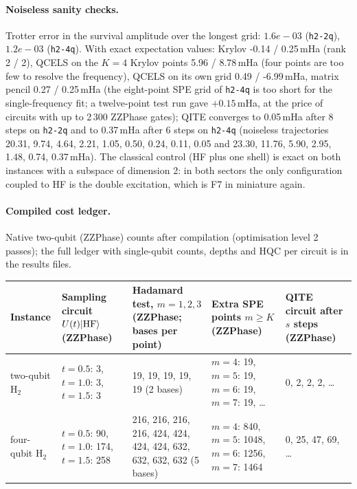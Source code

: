 \documentclass[11pt,a4paper]{article}
\newcommand{\ket}[1]{\lvert #1\rangle}
\begin{document}
\paragraph{Noiseless sanity checks.} Trotter error in the survival amplitude over the longest grid: $1.6e-03$ (\texttt{h2-2q}), $1.2e-03$ (\texttt{h2-4q}). With exact expectation values: Krylov -0.14 / 0.25\,mHa (rank 2 / 2), QCELS on the $K=4$ Krylov points 5.96 / 8.78\,mHa (four points are too few to resolve the frequency), QCELS on its own grid 0.49 / -6.99\,mHa, matrix pencil 0.27 / 0.25\,mHa (the eight-point SPE grid of \texttt{h2-4q} is too short for the single-frequency fit; a twelve-point test run gave $+0.15$\,mHa, at the price of circuits with up to 2\,300 ZZPhase gates); QITE converges to 0.05\,mHa after 8 steps on \texttt{h2-2q} and to 0.37\,mHa after 6 steps on \texttt{h2-4q} (noiseless trajectories 20.31, 9.74, 4.64, 2.21, 1.05, 0.50, 0.24, 0.11, 0.05 and 23.30, 11.76, 5.90, 2.95, 1.48, 0.74, 0.37\,mHa). The classical control (HF plus one shell) is exact on both instances with a subspace of dimension 2: in both sectors the only configuration coupled to HF is the double excitation, which is F7 in miniature again.

\paragraph{Compiled cost ledger.} Native two-qubit (ZZPhase) counts after compilation (optimisation level 2 passes); the full ledger with single-qubit counts, depths and HQC per circuit is in the results files.
\begin{center}\small
\begin{tabularx}{\linewidth}{@{}L{2.4cm}YYYY@{}}
\toprule
Instance & Sampling circuit $U(t)\ket{\rm HF}$ (ZZPhase) & Hadamard test, $m=1,2,3$ (ZZPhase; bases per point) & Extra SPE points $m\ge K$ (ZZPhase) & QITE circuit after $s$ steps (ZZPhase)\\\midrule
two-qubit H$_2$ & $t=0.5$: 3, $t=1.0$: 3, $t=1.5$: 3 & 19, 19, 19, 19, 19 (2 bases) & $m=4$: 19, $m=5$: 19, $m=6$: 19, $m=7$: 19, \ldots & 0, 2, 2, 2, \ldots\\
four-qubit H$_2$ & $t=0.5$: 90, $t=1.0$: 174, $t=1.5$: 258 & 216, 216, 216, 216, 424, 424, 424, 424, 632, 632, 632, 632 (5 bases) & $m=4$: 840, $m=5$: 1048, $m=6$: 1256, $m=7$: 1464 & 0, 25, 47, 69, \ldots\\
\bottomrule
\end{tabularx}
\end{center}
\end{document}
